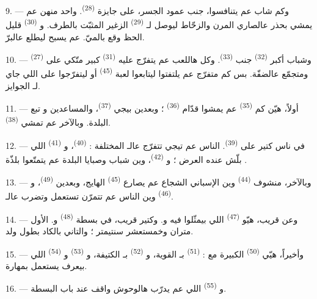 9. --- وكم شاب عم يتنافسوا، جنب عمود الجسر، على جايزة  \textsuperscript{(28)}. واحد منهن عم يمشي بحذر عالصاري المرن
والزحّاط ليوصل لـ \textsuperscript{(29)} الزغير المثبّت
بالطرف. و \textsuperscript{(30)} قليل الحظ وقع
بالميّ. عم يسبح ليطلع عالبرّ.

10. --- وشباب أكبر  \textsuperscript{(32)}
جنب  \textsuperscript{(33)}. وكل هاللعب عم يتفرّج عليه
 \textsuperscript{(31)} كبير متّكي على 
 \textsuperscript{(27)} ومتجمّع عالضفّة. بس كم متفرّج عم
يلتفتوا ليتابعوا لعبة  \textsuperscript{(45)} أو
ليتفرّجوا على  اللي جاي لـ
الجوايز.

11. --- أولاً، هيّن كم  \textsuperscript{(35)} عم يمشوا
قدّام  \textsuperscript{(36)} ؛ وبعدين بيجي
 \textsuperscript{(37)}، والمساعدين
و تبع البلدة. وبالآخر عم تمشي
 \textsuperscript{(38)}.

\VUsaut{5.0mm}
\VUsaut{3.6mm}

12. --- في ناس كتير على  \textsuperscript{(39)}.
الناس عم تيجي تتفرّج عالـ المختلفة :  \textsuperscript{(40)}، و \textsuperscript{(41)}
اللي بلّش عنده العرض ؛ و \textsuperscript{(42)}،
وين شباب وصبايا البلدة عم يتمتّعوا بلذّة .

13. --- وبالآخر، منشوف  \textsuperscript{(44)} وين
 الإسباني الشجاع عم يصارع 
\textsuperscript{(45)} الهايج، وبعدين 
\textsuperscript{(49)}، و \textsuperscript{(46)}
وين الناس عم تتمرّن تستعمل  وتضرب عالـ.

14. --- وعن قريب، هيّو  \textsuperscript{(47)} اللي
بيمثّلوا فيه  و. وكتير قريب، في
بسطة  \textsuperscript{(48)} و.
 الأول متران وخمستعشر سنتيمتر ؛ والتاني بالكاد بطول ولد.

15. --- وأخيراً، هيّي  \textsuperscript{(50)}
الكبيرة مع  :  \textsuperscript{(51)}
بـ القوية، و \textsuperscript{(52)}
بـ الكتيفة، و \textsuperscript{(53)}
و \textsuperscript{(54)} اللي بيعرف يستعمل
 بمهارة.

16. --- و \textsuperscript{(55)} اللي عم يدرّب هالوحوش
واقف عند باب البسطة.

\VUsaut{6.0mm}
\VUfilet{22mm}
